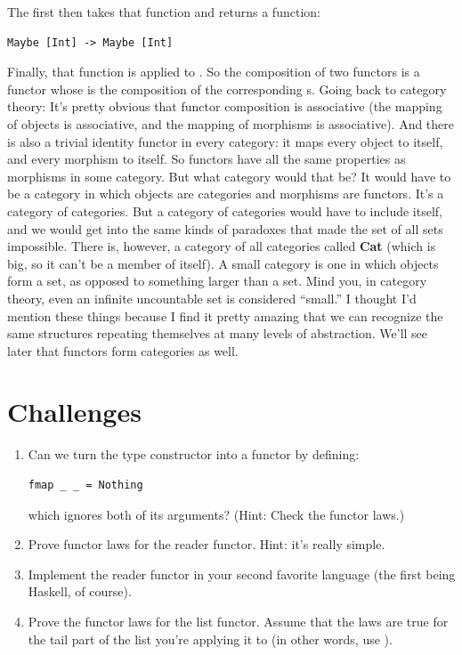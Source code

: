 The first  then takes that function and returns a function:

\begin{verbatim}
Maybe [Int] -> Maybe [Int]
\end{verbatim}

Finally, that function is applied to . So the composition of
two functors is a functor whose  is the composition of the
corresponding s. Going back to category theory: It's pretty
obvious that functor composition is associative (the mapping of objects
is associative, and the mapping of morphisms is associative). And there
is also a trivial identity functor in every category: it maps every
object to itself, and every morphism to itself. So functors have all the
same properties as morphisms in some category. But what category would
that be? It would have to be a category in which objects are categories
and morphisms are functors. It's a category of categories. But a
category of  categories would have to include itself, and we
would get into the same kinds of paradoxes that made the set of all sets
impossible. There is, however, a category of all  categories
called \textbf{Cat} (which is big, so it can't be a member of itself). A
small category is one in which objects form a set, as opposed to
something larger than a set. Mind you, in category theory, even an
infinite uncountable set is considered ``small.'' I thought I'd mention
these things because I find it pretty amazing that we can recognize the
same structures repeating themselves at many levels of abstraction.
We'll see later that functors form categories as well.

\section{Challenges}\label{challenges}

\begin{enumerate}
\item
  Can we turn the  type constructor into a functor by
  defining:

\begin{verbatim}
fmap _ _ = Nothing
\end{verbatim}

  which ignores both of its arguments? (Hint: Check the functor laws.)
\item
  Prove functor laws for the reader functor. Hint: it's really simple.
\item
  Implement the reader functor in your second favorite language (the
  first being Haskell, of course).
\item
  Prove the functor laws for the list functor. Assume that the laws are
  true for the tail part of the list you're applying it to (in other
  words, use ).
\end{enumerate}

